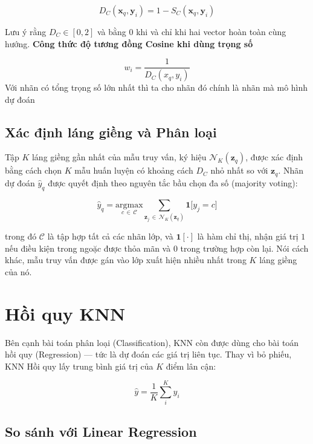 \documentclass[12pt,a4paper]{article}
\begin{document}
\begin{equation}
    D_C(\mathbf{x}_q, \mathbf{y}_i) = 1 - S_C(\mathbf{x}_q, \mathbf{y}_i)
\end{equation}

Lưu ý rằng $D_C \in [0, 2]$ và bằng $0$ khi và chỉ khi hai vector hoàn
toàn cùng hướng.
\textbf{Công thức độ tương đồng Cosine khi dùng trọng số}

\begin{equation}
    w_i=\frac{1}{D_C(x_q,y_i)}
\end{equation} 
Với nhãn có tổng trọng số lớn nhất thì ta cho nhãn đó chính là nhãn mà mô hình dự đoán 
\subsection{Xác định láng giềng và Phân loại}

Tập $K$ láng giềng gần nhất của mẫu truy vấn, ký hiệu
$\mathcal{N}_K(\mathbf{z}_q)$, được xác định bằng cách chọn $K$ mẫu
huấn luyện có khoảng cách $D_C$ nhỏ nhất so với $\mathbf{z}_q$.
Nhãn dự đoán $\hat{y}_q$ được quyết định theo nguyên tắc bầu chọn đa số
(majority voting):

\begin{equation}
    \hat{y}_q
    = \underset{c \,\in\, \mathcal{C}}{\mathrm{argmax}}
      \sum_{\mathbf{z}_j \,\in\, \mathcal{N}_K(\mathbf{z}_q)}
      \mathbf{1}\bigl[y_j = c\bigr]
\end{equation}

trong đó $\mathcal{C}$ là tập hợp tất cả các nhãn lớp, và
$\mathbf{1}[\cdot]$ là hàm chỉ thị, nhận giá trị $1$ nếu điều kiện trong
ngoặc được thỏa mãn và $0$ trong trường hợp còn lại. Nói cách khác, mẫu
truy vấn được gán vào lớp xuất hiện nhiều nhất trong $K$ láng giềng của nó.
\section{Hồi quy KNN}

Bên cạnh bài toán phân loại (Classification), KNN còn được dùng cho bài toán hồi quy (Regression) — tức là dự đoán các giá trị liên tục. Thay vì bỏ phiếu, KNN Hồi quy lấy trung bình giá trị của $K$ điểm lân cận:

\begin{equation}
    \hat{y} = \frac{1}{K} \sum_{i}^{K} y_i
\end{equation}



\subsection{So sánh với Linear Regression}
\end{document}
